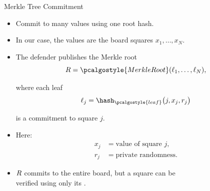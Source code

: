\begin{frame}{Merkle Tree Commitment}
    \footnotesize
    \begin{itemize}
        \item {} Commit to many values using one root hash.
    
        \item In our case, the values are the board squares $x_1, \dots, x_N$.
    
        \item The defender publishes the Merkle root
        \begin{equation*}
            \mroot = \pcalgostyle{MerkleRoot}\del{\ell_1, \dots, \ell_N},
        \end{equation*}
        
        where each leaf
        \begin{equation*}
            \ell_j = \hash_{\pcalgostyle{leaf}}\del{j, x_j, r_j}
        \end{equation*}
        
        is a commitment to square $j$.

        \item Here:
        \begin{align*}
            x_j &= \text{value of square } j, \\
            r_j &= \text{private randomness}.
        \end{align*}
    
        \item $R$ commits to the entire board, but a square can be \\
        verified using only its .
    \end{itemize}
\end{frame}

